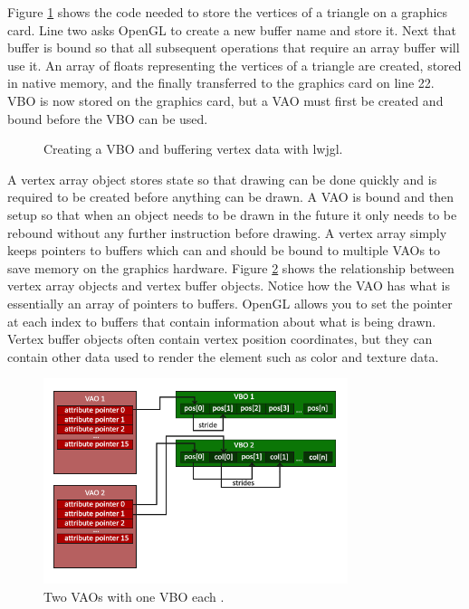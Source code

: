 \documentclass{article}
\begin{document}
Figure \ref{fig:create-vbo} shows the code needed to store the vertices of a triangle on a graphics card. Line two asks OpenGL to create a new buffer name and store it. Next that buffer is bound so that all subsequent operations that require an array buffer will use it. An array of floats representing the vertices of a triangle are created, stored in native memory, and the finally transferred to the graphics card on line 22. VBO is now stored on the graphics card, but a VAO must first be created and bound before the VBO can be used.

\begin{figure}[h]
	
	\caption{Creating a VBO and buffering vertex data with lwjgl.}
	\label{fig:create-vbo}
\end{figure}

A vertex array object stores state so that drawing can be done quickly and is required to be created before anything can be drawn. A VAO is bound and then setup so that when an object needs to be drawn in the future it only needs to be rebound without any further instruction before drawing. A vertex array simply keeps pointers to buffers which can and should be bound to multiple VAOs to save memory on the graphics hardware. Figure \ref{fig:vbo-vao-ebo} shows the relationship between vertex array objects and vertex buffer objects. Notice how the VAO has what is essentially an array of pointers to buffers. OpenGL allows you to set the pointer at each index to buffers that contain information about what is being drawn. Vertex buffer objects often contain vertex position coordinates, but they can contain other data used to render the element such as color and texture data.

\begin{figure}[h]
    \centering
	\includegraphics[height=6cm]{vao}
	\caption{Two VAOs with one VBO each \cite{devries2019}.}
	\label{fig:vbo-vao-ebo}
\end{figure}
\end{document}
